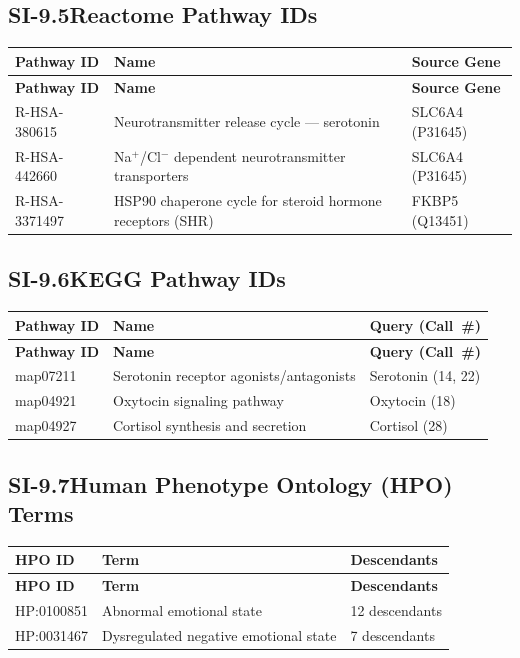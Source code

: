 \subsection*{SI-9.5\quad Reactome Pathway IDs}

{\small
\begin{longtable}{@{}l p{7cm} l@{}}
\toprule
\textbf{Pathway ID} & \textbf{Name} & \textbf{Source Gene} \\
\midrule
\endfirsthead
\toprule
\textbf{Pathway ID} & \textbf{Name} & \textbf{Source Gene} \\
\midrule
\endhead
\bottomrule
\endlastfoot
R-HSA-380615  & Neurotransmitter release cycle --- serotonin & SLC6A4 (P31645) \\
\midrule
R-HSA-442660  & Na$^+$/Cl$^-$ dependent neurotransmitter transporters & SLC6A4 (P31645) \\
\midrule
R-HSA-3371497 & HSP90 chaperone cycle for steroid hormone receptors (SHR) & FKBP5 (Q13451) \\
\end{longtable}
}

\subsection*{SI-9.6\quad KEGG Pathway IDs}

{\small
\begin{longtable}{@{}l l l@{}}
\toprule
\textbf{Pathway ID} & \textbf{Name} & \textbf{Query (Call~\#)} \\
\midrule
\endfirsthead
\toprule
\textbf{Pathway ID} & \textbf{Name} & \textbf{Query (Call~\#)} \\
\midrule
\endhead
\bottomrule
\endlastfoot
map07211 & Serotonin receptor agonists/antagonists & Serotonin (14, 22) \\
\midrule
map04921 & Oxytocin signaling pathway & Oxytocin (18) \\
\midrule
map04927 & Cortisol synthesis and secretion & Cortisol (28) \\
\end{longtable}
}

\subsection*{SI-9.7\quad Human Phenotype Ontology (HPO) Terms}

{\small
\begin{longtable}{@{}l l l@{}}
\toprule
\textbf{HPO ID} & \textbf{Term} & \textbf{Descendants} \\
\midrule
\endfirsthead
\toprule
\textbf{HPO ID} & \textbf{Term} & \textbf{Descendants} \\
\midrule
\endhead
\bottomrule
\endlastfoot
HP:0100851 & Abnormal emotional state & 12 descendants \\
\midrule
HP:0031467 & Dysregulated negative emotional state & 7 descendants \\
\end{longtable}
}

